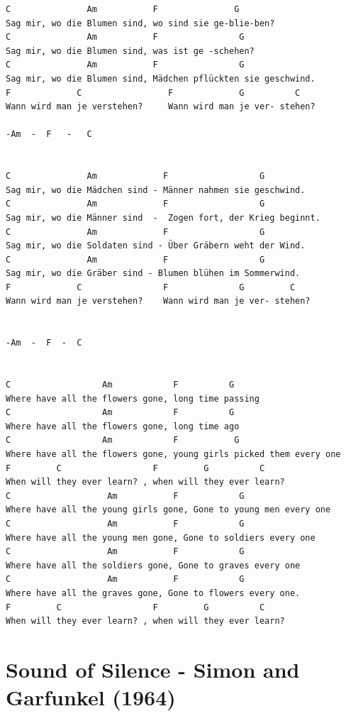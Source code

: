 \documentclass[
]{book}
\let\stdsection\section
\renewcommand\section{\clearpage\stdsection}
\begin{document}
\begin{verbatim}
C               Am           F               G
Sag mir, wo die Blumen sind, wo sind sie ge-blie-ben?
C               Am           F                G
Sag mir, wo die Blumen sind, was ist ge -schehen?
C               Am           F                G
Sag mir, wo die Blumen sind, Mädchen pflückten sie geschwind.
F             C                 F             G          C
Wann wird man je verstehen?     Wann wird man je ver- stehen?

-Am  -  F   -   C


C               Am             F                  G
Sag mir, wo die Mädchen sind - Männer nahmen sie geschwind.
C               Am             F                  G
Sag mir, wo die Männer sind  -  Zogen fort, der Krieg beginnt.
C               Am             F                  G
Sag mir, wo die Soldaten sind - Über Gräbern weht der Wind. 
C               Am             F                  G           
Sag mir, wo die Gräber sind - Blumen blühen im Sommerwind.
F             C                F              G         C
Wann wird man je verstehen?    Wann wird man je ver- stehen?


-Am  -  F  -  C


C                  Am            F          G
Where have all the flowers gone, long time passing
C                  Am            F          G
Where have all the flowers gone, long time ago
C                  Am            F           G
Where have all the flowers gone, young girls picked them every one
F         C                  F         G          C   
When will they ever learn? , when will they ever learn?
C                   Am           F            G
Where have all the young girls gone, Gone to young men every one
C                   Am           F            G
Where have all the young men gone, Gone to soldiers every one
C                   Am           F            G   
Where have all the soldiers gone, Gone to graves every one
C                   Am           F            G  
Where have all the graves gone, Gone to flowers every one.
F         C                  F         G          C
When will they ever learn? , when will they ever learn?
\end{verbatim}

\hypertarget{classics-sound-of-silence}{%
\section{Sound of Silence - Simon and Garfunkel (1964)}\label{classics-sound-of-silence}}
\end{document}
